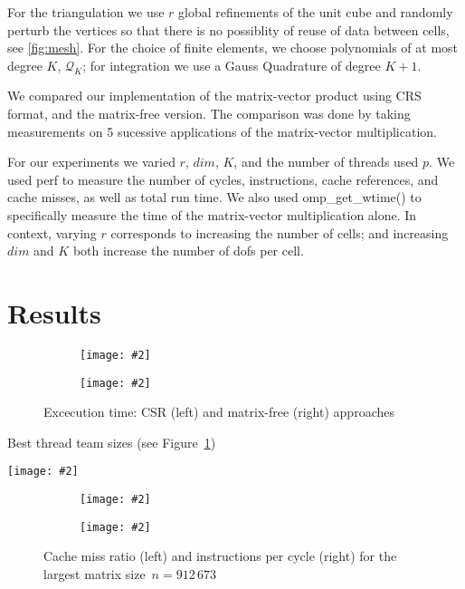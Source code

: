 \documentclass[12pt]{article}
\newcommand{\includegraphicsw}[2][1.]{\texttt{[image: \#2]}}
\begin{document}
For the triangulation we use $r$ global refinements of the unit cube and randomly perturb the vertices so that there is no possiblity of reuse of data between cells, see \ref{fig:mesh}. For the choice of finite elements, we choose polynomials of at most degree $K$, $\mathcal{Q}_{K}$; for integration we use a Gauss Quadrature of degree $K+1$. 

We compared our implementation of the matrix-vector product using CRS format, and the matrix-free version. The comparison was done by taking measurements on 5 sucessive applications of the matrix-vector multiplication.

For our experiments we varied $r$, $dim$, $K$, and the number of threads used $p$. We used perf to measure the number of cycles, instructions, cache references, and cache misses, as well as total run time. We also used omp\_get\_wtime() to specifically measure the time of the matrix-vector multiplication alone. In context, varying $r$ corresponds to increasing the number of cells; and increasing $dim$ and $K$ both increase the number of dofs per cell. 

\section{Results}
\begin{figure}[H]
	\centering
	\begin{subfigure}{.5\linewidth}
		\includegraphicsw{clTime.pdf}
	\end{subfigure}%
	\begin{subfigure}{.5\linewidth}
		\includegraphicsw{mfTime.pdf}
	\end{subfigure}%
	\caption{Excecution time: CSR (left) and matrix-free (right) approaches}\label{fig:time}
\end{figure}

\begin{table}[H]
	\centering\caption{Best thread team sizes (see Figure~\ref{fig:time})}
	\includegraphicsw[.9]{bestTime.pdf}
\end{table}

\begin{figure}[H]
	\centering
	\begin{subfigure}{.5\linewidth}
		\includegraphicsw{cache.pdf}
	\end{subfigure}%
	\begin{subfigure}{.5\linewidth}
		\includegraphicsw{inst.pdf}
	\end{subfigure}
	\caption{Cache miss ratio (left) and instructions per cycle (right) for the largest matrix size~$n = 912\,673$}
\end{figure}
\end{document}
